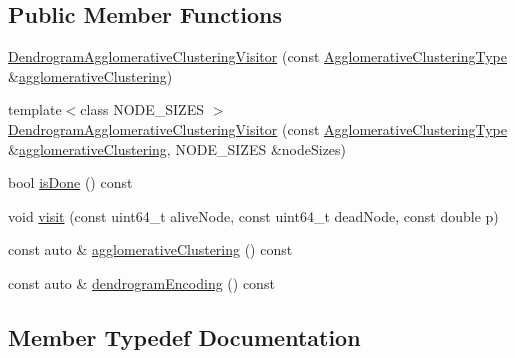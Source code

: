\subsection*{Public Member Functions}
\begin{DoxyCompactItemize}
\item 
\hyperlink{classnifty_1_1graph_1_1agglo_1_1DendrogramAgglomerativeClusteringVisitor_a0312d190fc33b4d1bcc07791f409f520}{Dendrogram\+Agglomerative\+Clustering\+Visitor} (const \hyperlink{classnifty_1_1graph_1_1agglo_1_1DendrogramAgglomerativeClusteringVisitor_a78a8c905d28562d120d4827cbfbc57bc}{Agglomerative\+Clustering\+Type} \&\hyperlink{classnifty_1_1graph_1_1agglo_1_1DendrogramAgglomerativeClusteringVisitor_a0abd59925ced8e1147fd8554613dfab2}{agglomerative\+Clustering})
\item 
{\footnotesize template$<$class N\+O\+D\+E\+\_\+\+S\+I\+Z\+ES $>$ }\\\hyperlink{classnifty_1_1graph_1_1agglo_1_1DendrogramAgglomerativeClusteringVisitor_ad7fee0b92e3fce5087ad4a4ffe8f885f}{Dendrogram\+Agglomerative\+Clustering\+Visitor} (const \hyperlink{classnifty_1_1graph_1_1agglo_1_1DendrogramAgglomerativeClusteringVisitor_a78a8c905d28562d120d4827cbfbc57bc}{Agglomerative\+Clustering\+Type} \&\hyperlink{classnifty_1_1graph_1_1agglo_1_1DendrogramAgglomerativeClusteringVisitor_a0abd59925ced8e1147fd8554613dfab2}{agglomerative\+Clustering}, N\+O\+D\+E\+\_\+\+S\+I\+Z\+ES \&node\+Sizes)
\item 
bool \hyperlink{classnifty_1_1graph_1_1agglo_1_1DendrogramAgglomerativeClusteringVisitor_a0941aeea1a4ddd0d4b6915bc5740809e}{is\+Done} () const
\item 
void \hyperlink{classnifty_1_1graph_1_1agglo_1_1DendrogramAgglomerativeClusteringVisitor_a9335b363cf919ce31d4d366f169712ab}{visit} (const uint64\+\_\+t alive\+Node, const uint64\+\_\+t dead\+Node, const double p)
\item 
const auto \& \hyperlink{classnifty_1_1graph_1_1agglo_1_1DendrogramAgglomerativeClusteringVisitor_a0abd59925ced8e1147fd8554613dfab2}{agglomerative\+Clustering} () const
\item 
const auto \& \hyperlink{classnifty_1_1graph_1_1agglo_1_1DendrogramAgglomerativeClusteringVisitor_a1a5d04ed93b944429bef3bc48ba470c9}{dendrogram\+Encoding} () const
\end{DoxyCompactItemize}


\subsection{Member Typedef Documentation}
\mbox{\label{classnifty_1_1graph_1_1agglo_1_1DendrogramAgglomerativeClusteringVisitor_a78a8c905d28562d120d4827cbfbc57bc}} 
